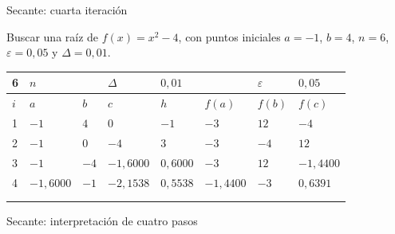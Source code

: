 \documentclass[original_version/main.tex]{subfiles}
\begin{document}
\begin{frame}[t]{Secante: cuarta iteración}
\begin{minipage}[t][13mm][t]{\textwidth}\small Buscar una raíz de $f(x)=x^2-4$, con puntos iniciales $a=-1$, $b=4$, $n=6$, $\varepsilon=0{,}05$ y $\Delta=0{,}01$.\end{minipage}\par{\scriptsize\setlength{\tabcolsep}{2pt}\renewcommand{\arraystretch}{1}\begin{center}\begin{tabular}{|C{.04\textwidth}|C{.112\textwidth}|C{.112\textwidth}|C{.112\textwidth}|C{.112\textwidth}|C{.112\textwidth}|C{.112\textwidth}|C{.112\textwidth}|}
\hline
\rule{0pt}{4.3mm}6 & $n$ &  &  $\Delta$  & $0{,}01$ &  & $\varepsilon$ & $0{,}05$\\\hline
\rule{0pt}{4.3mm}$i$ & $a$ & $b$ & $c$ & $h$ & $f(a)$ & $f(b)$ & $f(c)$\\\hline
\rule{0pt}{4.3mm}1 & $-1$ & $4$ & $0$ & $-1$ & $-3$ & $12$ & $-4$\\\hline
\rule{0pt}{4.3mm}2 & $-1$ & $0$ & $-4$ & $3$ & $-3$ & $-4$ & $12$\\\hline
\rule{0pt}{4.3mm}3 & $-1$ & $-4$ & $-1{,}6000$ & $0{,}6000$ & $-3$ & $12$ & $-1{,}4400$\\\hline
\rule{0pt}{4.3mm}4 & $-1{,}6000$ & $-1$ & $-2{,}1538$ & $0{,}5538$ & $-1{,}4400$ & $-3$ & $0{,}6391$\\\hline
\rule{0pt}{4.3mm} &  &  &  &  &  &  & \\\hline
\rule{0pt}{4.3mm} &  &  &  &  &  &  & \\\hline
\end{tabular}\end{center}}\begin{minipage}[t][10mm][t]{\textwidth}\footnotesize \end{minipage}
\end{frame}

\begin{frame}{Secante: interpretación de cuatro pasos}
\end{frame}
\end{document}
